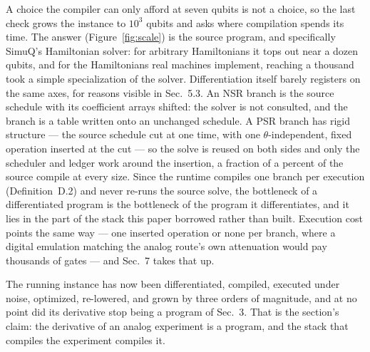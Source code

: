 A choice the compiler can only afford at seven qubits is not a choice, so
the last check grows the instance to $10^{3}$ qubits and asks where
compilation spends its time. The answer (Figure~\ref{fig:scale}) is the
source program, and specifically SimuQ's Hamiltonian solver: for arbitrary
Hamiltonians it tops out near a dozen qubits, and for the 
Hamiltonians real machines implement, reaching a thousand took a simple
specialization of the solver. Differentiation itself barely registers on
the same axes, for reasons visible in Sec.~5.3. An NSR branch is the
source schedule with its coefficient arrays shifted: the solver is not
consulted, and the branch is a table written onto an unchanged schedule. A
PSR branch has rigid structure --- the source schedule cut at one time,
with one $\theta$-independent, fixed operation inserted at the
cut --- so the solve is reused on both sides and only the scheduler and
ledger work around the insertion, a fraction of a percent of the source
compile at every size. Since the runtime compiles one branch per execution
(Definition~D.2) and never re-runs the source solve, the bottleneck of a
differentiated program is the bottleneck of the program it differentiates,
and it lies in the part of the stack this paper borrowed rather than
built. Execution cost points the same way --- one inserted operation or
none per branch, where a digital emulation matching the analog route's own
attenuation would pay thousands of gates --- and Sec.~7 takes that up.

The running instance has now been differentiated, compiled, executed under
noise, optimized, re-lowered, and grown by three orders of magnitude, and
at no point did its derivative stop being a program of Sec.~3. That is the
section's claim: the derivative of an analog experiment is a program, and
the stack that compiles the experiment compiles it.


